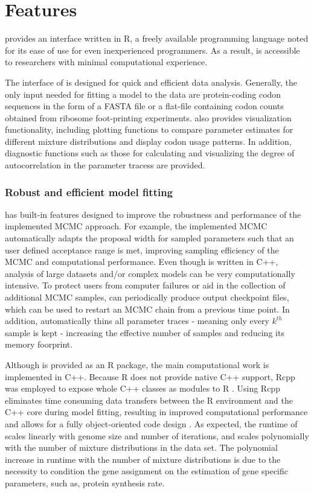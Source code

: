 \section{Features}
\package provides an interface written in R, a freely available programming language noted for its ease of use for even inexperienced programmers. 
As a result, \package is accessible to researchers with minimal computational experience. 

The interface of \package is designed for quick and efficient data analysis.
Generally, the only input needed for fitting a model to the data are protein-coding codon sequences in the form of a FASTA file or a flat-file containing codon counts obtained from ribosome foot-printing experiments. 
\package also provides visualization functionality, including plotting functions to compare parameter estimates for different mixture distributions and display codon usage patterns. 
In addition, diagnostic functions such as those for calculating and visualizing the degree of autocorrelation in the parameter tracess are provided.

\subsubsection{Robust and efficient model fitting}
\package has built-in features designed to improve the robustness and performance of the implemented MCMC approach. 
For example, the implemented MCMC automatically adapts the proposal width for sampled parameters such that an user defined acceptance range is met, improving sampling efficiency of the MCMC and computational performance.
Even though \package is written in C++, analysis of large datasets and/or complex models can be very computationally intensive.
To protect users from computer failures or aid in the collection of additional MCMC samples, \package can periodically produce output checkpoint files, which can be used to restart an MCMC chain from a previous time point.
In addition, \package automatically thins all parameter traces -  meaning only every $k^{th}$ sample is kept - increasing the effective number of samples and reducing its memory foorprint. 

Although \package is provided as an R package, the main computational work is implemented in C++.
Because R does not provide native C++ support, Rcpp was employed to expose whole C++ classes as modules to R \citep{rcpp_package}.
Using Rcpp eliminates time consuming data transfers between the R environment and the C++ core during model fitting, resulting in improved computational performance and allows for a fully object-oriented code design \citep{ood_book}. 
As expected, the runtime of \package scales linearly with genome size and number of iterations, and scales polynomially with the number of mixture distributions in the data set. 
The polynomial increase in runtime with the number of mixture distributions is due to the necessity to condition the gene assignment on the estimation of gene specific parameters, such as, protein synthesis rate.

